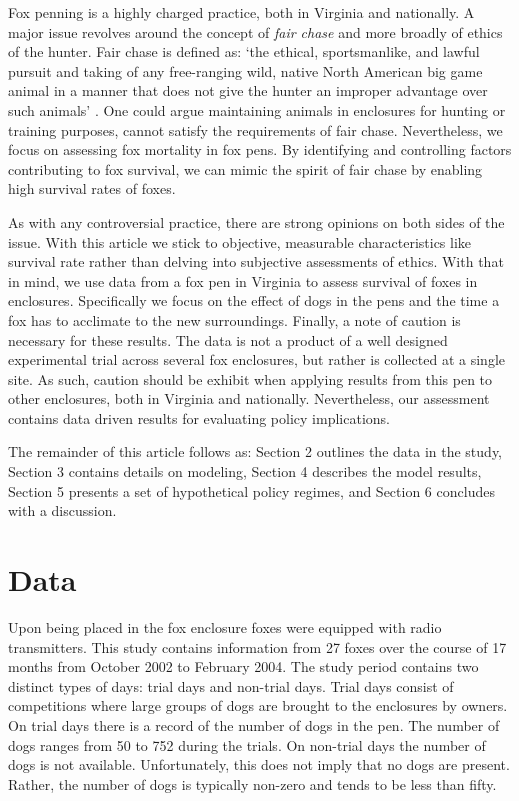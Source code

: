 \documentclass[aoas,preprint]{imsart}
\numberwithin{equation}{section}
\theoremstyle{plain}
\begin{document}
Fox penning is a highly charged practice, both in Virginia and nationally. A major issue revolves around the concept of \emph{fair chase} \citep{posewitz} and more broadly of ethics of the hunter. Fair chase is defined as: `the ethical, sportsmanlike, and lawful pursuit and taking of any free-ranging wild, native North American big game animal in a manner that does not give the hunter an improper advantage over such animals' \citep{boone}. One could argue maintaining animals in enclosures for hunting or training purposes, cannot satisfy the requirements of fair chase. Nevertheless, we focus on assessing fox mortality in fox pens. By identifying and controlling factors contributing to fox survival, we can mimic the spirit of fair chase by enabling high survival rates of foxes.

As with any controversial practice, there are strong opinions on both sides of the issue. With this article we stick to objective, measurable characteristics like survival rate rather than delving into subjective assessments of ethics. With that in mind, we use data from a fox pen in Virginia to assess survival of foxes in enclosures. Specifically we focus on the effect of dogs in the pens and the time a fox has to acclimate to the new surroundings. Finally, a note of caution is necessary for these results. The data is not a product of a well designed experimental trial across several fox enclosures, but rather is collected at a single site. As such, caution should be exhibit when applying results from this pen to other enclosures, both in Virginia and nationally. Nevertheless, our assessment contains data driven results for evaluating policy implications.

The remainder of this article follows as: Section 2 outlines the data in the study, Section 3 contains details on modeling, Section 4 describes the model results, Section 5 presents a set of hypothetical policy regimes, and Section 6 concludes with a discussion.

\section{Data} Upon being placed in the fox enclosure foxes were equipped with radio transmitters. This study contains information from 27 foxes over the course of 17 months from October 2002 to February 2004. The study period contains two distinct types of days: trial days and non-trial days. Trial days consist of competitions where large groups of dogs are brought to the enclosures by owners. On trial days there is a record of the number of dogs in the pen. The number of dogs ranges from 50 to 752 during the trials. On non-trial days the number of dogs is not available. Unfortunately, this does not imply that no dogs are present. Rather, the number of dogs is typically non-zero and tends to be less than fifty.
\end{document}
